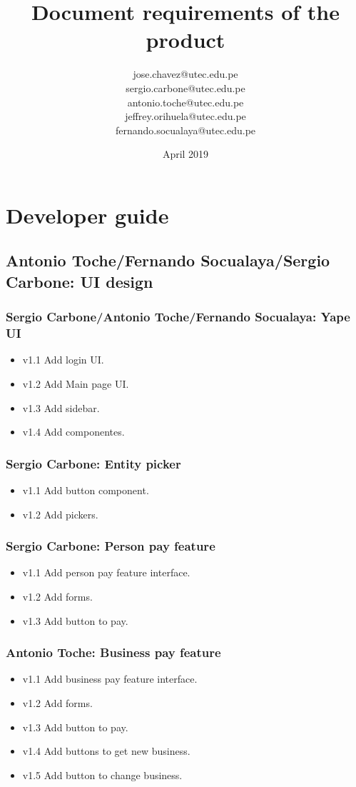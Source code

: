 \documentclass{article}
\title{Document requirements of the product}
\author{jose.chavez@utec.edu.pe \\ sergio.carbone@utec.edu.pe\\antonio.toche@utec.edu.pe\\jeffrey.orihuela@utec.edu.pe\\fernando.socualaya@utec.edu.pe}
\date{April 2019}
\begin{document}
\maketitle
 

\section{Developer guide}
 \subsection{Antonio Toche/Fernando Socualaya/Sergio Carbone: UI design}
 \blindtext
\subsubsection{Sergio Carbone/Antonio Toche/Fernando Socualaya: Yape UI}
\begin{itemize}
\item v1.1 Add login UI.
\item v1.2 Add Main page UI.
\item v1.3 Add sidebar.
\item v1.4 Add componentes.
\end{itemize}

\subsubsection{Sergio Carbone: Entity picker}
\begin{itemize}
\item v1.1 Add button component.
\item v1.2 Add pickers.
\end{itemize}

\subsubsection{Sergio Carbone: Person pay feature}
\begin{itemize}
\item v1.1 Add person pay feature interface.
\item v1.2 Add forms.
\item v1.3 Add button to pay.
\end{itemize}

\subsubsection{Antonio Toche: Business pay feature}
\begin{itemize}
\item v1.1 Add business pay feature interface.
\item v1.2 Add forms.
\item v1.3 Add button to pay.
\item v1.4 Add buttons to get new business.
\item v1.5 Add button to change business.
\end{itemize}
\end{document}
